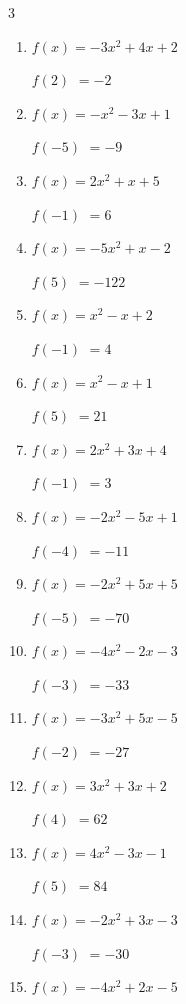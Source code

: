 \begin{multicols}{3}
\begin{enumerate}
$f(2)$
        $= -11$

\columnbreak %

  \item $f(x)=-3x^{2}+4x+2$

$f(2)$
        $= -2$

  \item $f(x)=-x^{2}-3x+1$

$f(-5)$
        $= -9$

  \item $f(x)=2x^{2}+x+5$

$f(-1)$
        $= 6$

  \item $f(x)=-5x^{2}+x-2$

$f(5)$
        $= -122$

  \item $f(x)=x^{2}-x+2$

$f(-1)$
        $= 4$

  \item $f(x)=x^{2}-x+1$

$f(5)$
        $= 21$

  \item $f(x)=2x^{2}+3x+4$

$f(-1)$
        $= 3$

  \item $f(x)=-2x^{2}-5x+1$

$f(-4)$
        $= -11$

  \item $f(x)=-2x^{2}+5x+5$

$f(-5)$
        $= -70$

  \item $f(x)=-4x^{2}-2x-3$

$f(-3)$
        $= -33$

  \item $f(x)=-3x^{2}+5x-5$

$f(-2)$
        $= -27$

  \item $f(x)=3x^{2}+3x+2$

$f(4)$
        $= 62$

  \item $f(x)=4x^{2}-3x-1$

$f(5)$
        $= 84$

  \item $f(x)=-2x^{2}+3x-3$

$f(-3)$
        $= -30$

  \item $f(x)=-4x^{2}+2x-5$


\end{enumerate}
\end{multicols}
